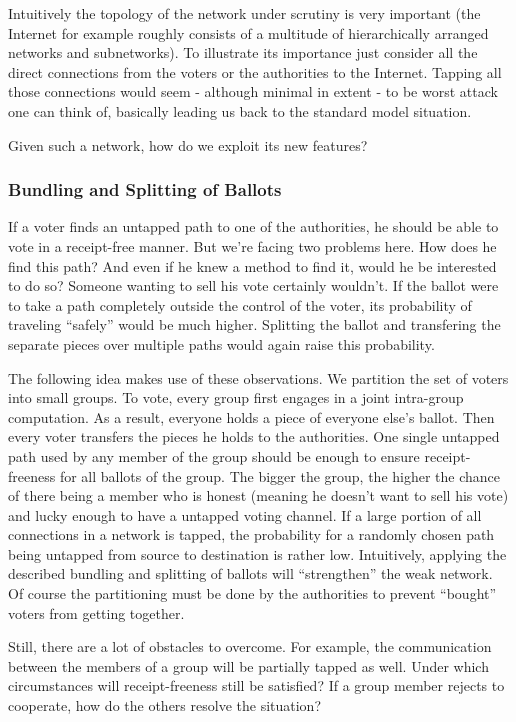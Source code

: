 \documentclass{article}
\begin{document}
Intuitively the topology of the network under scrutiny is very important (the Internet for example roughly consists of a multitude of hierarchically arranged networks and subnetworks).
To illustrate its importance just consider all the direct connections from the voters or the authorities to the Internet. Tapping all those connections would seem - although minimal in extent - to be worst attack one can think of, basically leading us back to the standard model situation.

Given such a network, how do we exploit its new features?

\subsubsection{Bundling and Splitting of Ballots}
If a voter finds an untapped path to one of the authorities, he should be able to vote in a receipt-free manner. But we're facing two problems here. How does he find this path? And even if he knew a method to find it, would he be interested to do so? Someone wanting to sell his vote certainly wouldn't.
If the ballot were to take a path completely outside the control of the voter, its probability of traveling ``safely'' would be much higher. Splitting the ballot and transfering the separate pieces over multiple paths would again raise this probability.

The following idea makes use of these observations. We partition the set of voters into small groups. To vote, every group first engages in a joint intra-group computation. As a result, everyone holds a piece of everyone else's ballot. Then every voter transfers the pieces he holds to the authorities. One single untapped path used by any member of the group should be enough to ensure receipt-freeness for all ballots of the group. The bigger the group, the higher the chance of there being a member who is honest (meaning he doesn't want to sell his vote) and lucky enough to have a untapped voting channel.
If a large portion of all connections in a network is tapped, the probability for a randomly chosen path being untapped from source to destination is rather low. Intuitively, applying the described bundling and splitting of ballots will ``strengthen'' the weak network. Of course the partitioning must be done by the authorities to prevent ``bought'' voters from getting together.

Still, there are a lot of obstacles to overcome. For example, the communication between the members of a group will be partially tapped as well. Under which circumstances will receipt-freeness still be satisfied? If a group member rejects to cooperate, how do the others resolve the situation?
\end{document}

